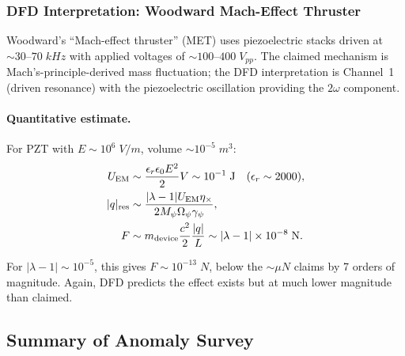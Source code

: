 \documentclass[aps,prd,twocolumn,superscriptaddress,floatfix,nofootinbib]{revtex4-2}
\newcommand{\Opsi}{\Omega_\psi}
\newcommand{\gpsi}{\gamma_\psi}
\newcommand{\Mpsi}{M_\psi}
\newcommand{\lam}{\lambda}
\begin{document}
\subsubsection{DFD Interpretation: Woodward Mach-Effect Thruster}

Woodward's ``Mach-effect thruster'' (MET) uses piezoelectric stacks
driven at $\sim 30$--$70\;\si{kHz}$ with applied voltages of
$\sim 100$--$400\;\si{V_{pp}}$. The claimed mechanism is
Mach's-principle-derived mass fluctuation; the DFD interpretation is
Channel~1 (driven resonance) with the piezoelectric oscillation
providing the $2\omega$ component.

\paragraph{Quantitative estimate.}
For PZT with $E \sim 10^6\;\si{V/m}$, volume $\sim 10^{-5}\;\si{m^3}$:
\begin{align}
U_{\rm EM} &\sim \frac{\epsilon_r\epsilon_0 E^2}{2}V
\sim 10^{-1}\;\si{J} \quad (\epsilon_r \sim 2000),\\
|q|_{\rm res} &\sim \frac{|\lam-1|U_{\rm EM}\eta_\times}
{2\Mpsi\Opsi\gpsi},\\
F &\sim m_{\rm device}\frac{c^2}{2}\frac{|q|}{L}
\sim |\lam-1| \times 10^{-8}\;\si{N}.
\end{align}

For $|\lam-1| \sim 10^{-5}$, this gives $F \sim 10^{-13}\;\si{N}$,
below the $\sim \si{\mu N}$ claims by 7 orders of magnitude. Again,
DFD predicts the effect exists but at much lower magnitude than claimed.

\subsection{Summary of Anomaly Survey}
\end{document}
